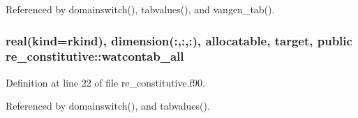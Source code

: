 Referenced by domainswitch(), tabvalues(), and vangen\+\_\+tab().

\subsubsection[{watcontab\+\_\+all}]{\setlength{\rightskip}{0pt plus 5cm}real(kind=rkind), dimension(\+:,\+:,\+:), allocatable, target, public re\+\_\+constitutive\+::watcontab\+\_\+all}\label{namespacere__constitutive_a3249b973baf1fa0d41eb4cd2784a384b}


Definition at line 22 of file re\+\_\+constitutive.\+f90.



Referenced by domainswitch(), and tabvalues().

